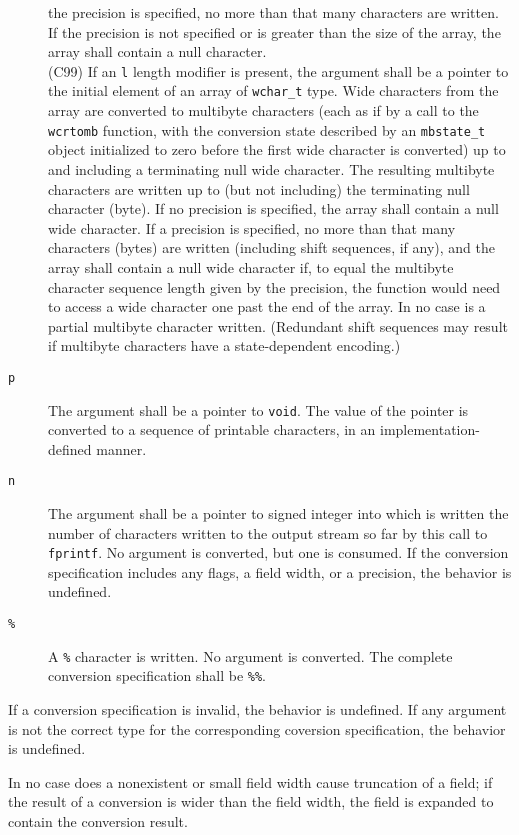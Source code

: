 \begin{description}
the precision is specified, no more than that many characters are written. If
the precision is not specified or is greater than the size of the array, the
array shall contain a null character.\\(C99) If an \texttt{l} length modifier
is present, the argument shall be a pointer to the initial element of an array
of \texttt{wchar\_t} type. Wide characters from the array are converted to
multibyte characters (each as if by a call to the \texttt{wcrtomb} function,
with the conversion state described by an \texttt{mbstate\_t} object
initialized to zero before the first wide character is converted) up to and
including a terminating null wide character. The resulting multibyte characters
are written up to (but not including) the terminating null character (byte). If
no precision is specified, the array shall contain a null wide character. If a
precision is specified, no more than that many characters (bytes) are written
(including shift sequences, if any), and the array shall contain a null wide
character if, to equal the multibyte character sequence length given by the
precision, the function would need to access a wide character one past the end
of the array. In no case is a partial multibyte character written. (Redundant
shift sequences may result if multibyte characters have a state-dependent
encoding.)
	\item[\texttt{p}] The argument shall be a pointer to \texttt{void}. The
value of the pointer is converted to a sequence of printable characters, in an
implementation-defined manner.
	\item[\texttt{n}] The argument shall be a pointer to signed integer into
which is written the number of characters written to the output stream so far
by this call to \texttt{fprintf}. No argument is converted, but one is
consumed. If the conversion specification includes any flags, a field width, or
a precision, the behavior is undefined.
	\item[\texttt{\%}] A \texttt{\%} character is written. No argument is
converted. The complete conversion specification shall be \texttt{\%\%}.
\end{description}

If a conversion specification is invalid, the behavior is undefined. If any
argument is not the correct type for the corresponding coversion specification,
the behavior is undefined.

In no case does a nonexistent or small field width cause truncation of a field;
if the result of a conversion is wider than the field width, the field is
expanded to contain the conversion result.


